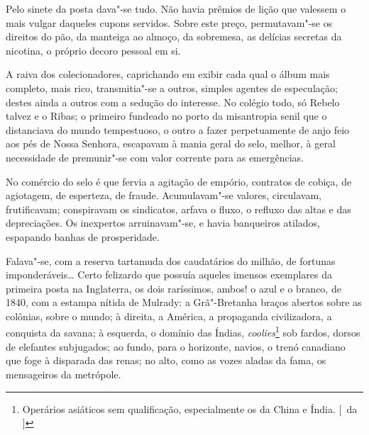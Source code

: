 Pelo sinete da posta dava"-se tudo. Não
havia prêmios de lição que valessem o mais vulgar daqueles cupons
servidos. Sobre este preço, permutavam"-se os direitos do pão, da
manteiga ao almoço, da sobremesa, as delícias secretas da nicotina, o
próprio decoro pessoal em si. 

A raiva dos colecionadores, caprichando
em exibir cada qual o álbum mais completo, mais rico, transmitia"-se a
outros, simples agentes de especulação; destes ainda a outros com a
sedução do interesse. No colégio todo, só Rebelo talvez e o Ribas; o
primeiro fundeado no porto da misantropia senil que o distanciava do
mundo tempestuoso, o outro a fazer perpetuamente de anjo feio aos pés
de Nossa Senhora, escapavam à mania geral do selo, melhor, à geral
necessidade de premunir"-se com valor corrente para as emergências. 

No comércio do selo é que fervia a agitação de empório, contratos de
cobiça, de agiotagem, de esperteza, de fraude. Acumulavam"-se valores,
circulavam, frutificavam; conspiravam os sindicatos, arfava o fluxo, o
refluxo das altas e das depreciações. Os inexpertos arruinavam"-se, e
havia banqueiros atilados, espapando banhas de prosperidade.

Falava"-se, com a reserva tartamuda dos caudatários do milhão, de
fortunas imponderáveis\ldots{} Certo felizardo que possuía aqueles imensos
exemplares da primeira posta na Inglaterra, os dois raríssimos, ambos!
o azul e o branco, de 1840, com a estampa nítida de Mulrady: a
Grã"-Bretanha braços abertos sobre as colônias, sobre o mundo; à
direita, a América, a propaganda civilizadora, a conquista da savana; à
esquerda, o domínio das Índias, \textit{coolies}\footnote{ Operários asiáticos sem qualificação, 
especialmente os da China e Índia. [~da ]} sob fardos, dorsos de elefantes
subjugados; ao fundo, para o horizonte, navios, o trenó canadiano que
foge à disparada das renas; no alto, como as vozes aladas da fama, 
os mensageiros da metrópole. 

